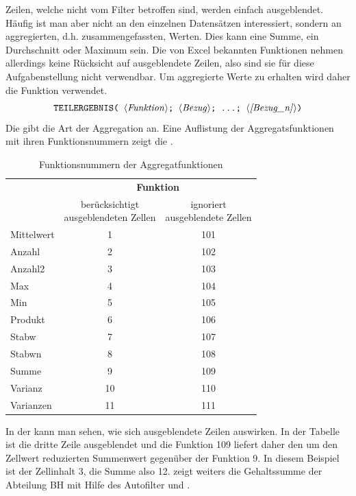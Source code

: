 Zeilen, welche nicht vom Filter betroffen sind, werden einfach ausgeblendet. Häufig ist man aber nicht an den einzelnen Datensätzen interessiert, sondern an aggregierten, d.h. zusammengefassten, Werten. Dies kann eine Summe, ein Durchschnitt oder Maximum sein. Die von Excel bekannten Funktionen nehmen allerdings keine Rücksicht auf ausgeblendete Zeilen, also sind sie für diese Aufgabenstellung nicht verwendbar. Um aggregierte Werte zu erhalten wird daher die  Funktion verwendet.
$$ \text{\stmt{TEILERGEBNIS( \syntax{Funktion}; \syntax{Bezug}; \ldots; \syntax{[Bezug\_n]})}} $$%
%
Die  gibt die Art der Aggregation an. Eine Auflistung der Aggregatsfunktionen mit ihren Funktionsnummern zeigt die .
\begin{table}[H]
	\centering
		\begin{tabular}{@{}lcc@{}}
			\toprule  & \multicolumn{2}{c}{\textbf{Funktion}}\\
			 & \parbox[t]{5cm}{\centering berücksichtigt\\ausgeblendeten Zellen} & \parbox[t]{5cm}{ \centering ignoriert\\ausgeblendete Zellen}\\
			\midrule Mittelwert & 1 & 101\\
			Anzahl & 2 & 102 \\
			Anzahl2 & 3 & 103\\
			Max & 4 & 104 \\
			Min & 5 & 105 \\
			Produkt & 6 & 106 \\
			Stabw & 7 & 107 \\
			Stabwn & 8 & 108 \\
			Summe & 9 & 109 \\
			Varianz & 10 & 110 \\
			Varianzen & 11 & 111\\
		\end{tabular}
	\caption{Funktionsnummern der Aggregatfunktionen}
	\label{tab:teilergebnis}
\end{table}%
\vspace{-1em}
In der  kann man sehen, wie sich ausgeblendete Zeilen auswirken. In der Tabelle ist die dritte Zeile ausgeblendet und die Funktion 109 liefert daher den um den Zellwert reduzierten Summenwert gegenüber der Funktion 9. In diesem Beispiel ist der Zellinhalt 3, die Summe also 12.  zeigt weiters die Gehaltssumme der Abteilung BH mit Hilfe des Autofilter und .
